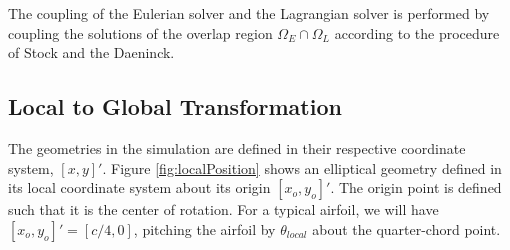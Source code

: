 The coupling of the Eulerian solver and the Lagrangian solver is performed by coupling the solutions of the overlap region $\Omega_E \cap \Omega_L$ according to the procedure of Stock and the Daeninck.

\subsection{Local to Global Transformation}

The geometries in the simulation are defined in their respective coordinate system, $[x,y]'$. Figure \ref{fig:localPosition} shows an elliptical geometry defined in its local coordinate system about its origin $[{x_o},{y_o}]'$. The origin point is defined such that it is the center of rotation. For a typical airfoil, we will have $[x_o,y_o]' = [c/4,0]$, pitching the airfoil by $\theta_{local}$ about the quarter-chord point.

